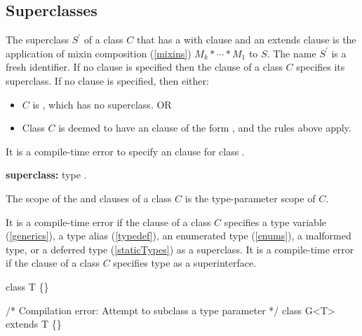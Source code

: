 \documentclass{article}
\begin{document}
\subsection{Superclasses}

\LMHash{}
The superclass $S^\prime$ of a class $C$ that has a with clause  and an extends clause  is the application of mixin composition (\ref{mixins}) $M_k* \cdots * M_1$ to $S$. The name $S^\prime$ is a fresh identifier.
If no \WITH{} clause is specified then the \EXTENDS{} clause of a class $C$ specifies its superclass.
If no \EXTENDS{} clause is specified, then either:
\begin{itemize}
\item $C$ is , which has no superclass. OR
\item Class $C$ is deemed to have an \EXTENDS{} clause of the form , and the rules above apply.
\end{itemize}

\LMHash{}
It is a compile-time error to specify an \EXTENDS{} clause for class .

\begin{grammar}
{\bf superclass:}\EXTENDS{} type
  .
\end{grammar}


\LMHash{}
The scope of the \EXTENDS{} and \WITH{} clauses of a class $C$ is the type-parameter scope of $C$.

\LMHash{}
It is a compile-time error if the \EXTENDS{} clause of a class $C$ specifies a type variable (\ref{generics}), a type alias (\ref{typedef}), an enumerated type (\ref{enums}), a malformed type, or a deferred type (\ref{staticTypes}) as a superclass.
It is a compile-time error if the \EXTENDS{} clause of a class $C$ specifies type \DYNAMIC{} as a superinterface.


\begin{dartCode}
class T \{\}

/* Compilation error: Attempt to subclass a type parameter */
class G<T> extends T \{\}

\end{dartCode}
\end{document}
